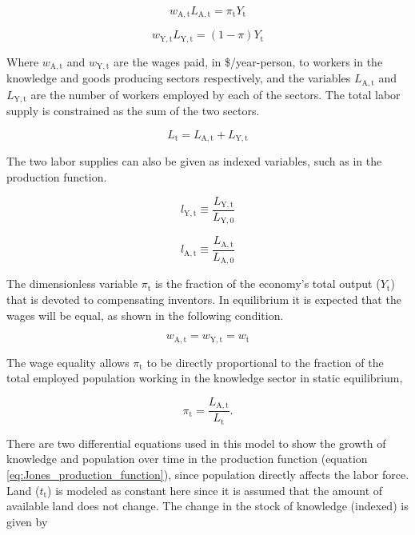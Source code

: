 \documentclass[letterpaper,12pt]{article}
\begin{document}
\begin{equation} \label{eq:knowledge_comp}
	w_\mathrm{A,t} L_\mathrm{A,t} = \pi_\mathrm{t} Y_\mathrm{t}
\end{equation}

\begin{equation} \label{eq:labor_comp}
	w_\mathrm{Y,t} L_\mathrm{Y,t} = (1-\pi) Y_\mathrm{t}
\end{equation}

Where $w_\mathrm{A,t}$ and $w_\mathrm{Y,t}$ are the wages paid, in \$/year-person, to workers in the knowledge and goods producing sectors respectively, and the variables $L_\mathrm{A,t}$ and $L_\mathrm{Y,t}$ are the number of workers employed by each of the sectors. The total labor supply is constrained as the sum of the two sectors.

\begin{equation} \label{labor_supply}
	L_\mathrm{t} = L_\mathrm{A,t} + L_\mathrm{Y,t}
\end{equation}

The two labor supplies can also be given as indexed variables, such as in the production function.

\begin{equation}
	l_\mathrm{Y,t} \equiv \frac{L_\mathrm{Y,t}}{L_\mathrm{Y,0}}
\end{equation}

\begin{equation}
	l_\mathrm{A,t} \equiv \frac{L_\mathrm{A,t}}{L_\mathrm{A,0}}
\end{equation}

The dimensionless variable $\pi_\mathrm{t}$ is the fraction of the economy's total output ($Y_\mathrm{t}$) that is devoted to compensating inventors. In equilibrium it is expected that the wages will be equal, as shown in the following condition.

\begin{equation} \label{eq:wage_equality}
	w_\mathrm{A,t} = w_\mathrm{Y,t} = w_\mathrm{t}
\end{equation}

The wage equality allows $\pi_\mathrm{t}$ to be directly proportional to the fraction of the total employed population working in the knowledge sector in static equilibrium,

\begin{equation} \label{eq:pi}
	\pi_\mathrm{t} = \frac{L_\mathrm{A,t}}{L_\mathrm{t}}.
\end{equation}

There are two differential equations used in this model to show the growth of knowledge and population over time in the production function (equation \ref{eq:Jones_production_function}), since population directly affects the labor force. Land ($t_\mathrm{t}$) is modeled as constant here since it is assumed that the amount of available land does not change. The change in the stock of knowledge (indexed) is given by
\end{document}
